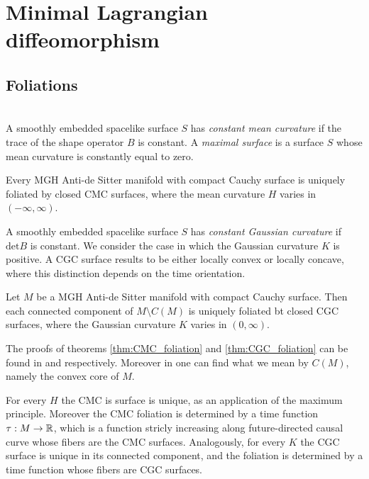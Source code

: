 \chapter{Minimal Lagrangian diffeomorphism}

\section{Foliations}
\\
A smoothly embedded spacelike surface $S$ has \textit{constant mean curvature} if the trace of the shape operator $B$ is constant. A \textit{maximal surface} is a surface $S$ whose mean curvature is constantly equal to zero.\\
\begin{theorem}\label{thm:CMC_foliation}
    Every MGH Anti-de Sitter manifold with compact Cauchy surface is uniquely foliated by closed CMC surfaces, where the mean curvature $H$ varies in $(-\infty,\infty)$.
\end{theorem}
A smoothly embedded spacelike surface $S$ has \textit{constant Gaussian curvature} if $\text{det}B$ is constant. We consider the case in which the Gaussian curvature $K$ is positive. A CGC surface results to be either locally convex or locally concave, where this distinction depends on the time orientation. 
\begin{theorem}\label{thm:CGC_foliation}
    Let $M$ be a MGH Anti-de Sitter manifold with compact Cauchy surface. Then each connected component of $M \setminus C(M)$ is uniquely foliated bt closed CGC surfaces, where the Gaussian curvature $K$ varies in $(0,\infty)$.
\end{theorem}
The proofs of theorems \ref{thm:CMC_foliation} and \ref{thm:CGC_foliation} can be found in \cite{barbot2004constant} and \cite{barbot2008prescribing} respectively. Moreover in \cite{barbot2008prescribing} one can find what we mean by $C(M)$, namely the convex core of $M$.
\begin{observation}
    For every $H$ the CMC is surface is unique, as an application of the maximum principle. Moreover the CMC foliation is determined by a time function $\tau:M\to\mathbb{R}$, which is a function stricly increasing along future-directed causal curve whose fibers are the CMC surfaces. Analogously, for every $K$ the CGC surface is unique in its connected component, and the foliation is determined by a time function whose fibers are CGC surfaces.
\end{observation}
